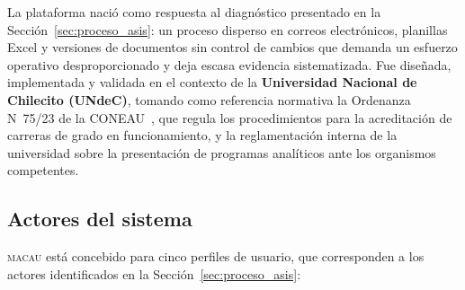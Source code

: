 La plataforma nació como respuesta al diagnóstico presentado en la
Sección~\ref{sec:proceso_asis}: un proceso disperso en correos electrónicos,
planillas Excel y versiones de documentos sin control de cambios que demanda
un esfuerzo operativo desproporcionado y deja escasa evidencia sistematizada.
Fue dise\~{n}ada, implementada y validada en el contexto de la
\textbf{Universidad Nacional de Chilecito (UNdeC)}, tomando como referencia normativa
la Ordenanza N\textdegree{}~75/23 de la CONEAU~\cite{ordenanza75}, que regula los
procedimientos para la acreditaci\'on de carreras de grado en funcionamiento,
y la reglamentaci\'on interna de la universidad sobre la presentaci\'on de programas
anal\'iticos ante los organismos competentes.

\subsection{Actores del sistema}

\textsc{macau} está concebido para cinco perfiles de usuario, que corresponden a los
actores identificados en la Sección~\ref{sec:proceso_asis}:

